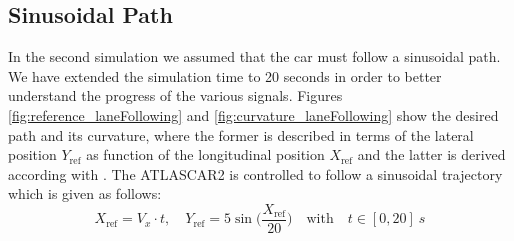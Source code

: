\subsection{Sinusoidal Path}
In the second simulation we assumed that the car must follow a sinusoidal path. We have extended the simulation time to 20 seconds in order to better understand the progress of the various signals. Figures \ref{fig:reference_laneFollowing} and \ref{fig:curvature_laneFollowing} show the desired path and its curvature, where the former is described in terms of the lateral position $Y_{\text{ref}}$ as function of the longitudinal position $X_{\text{ref}}$ and the latter is derived according with \cite{curvature}. The ATLASCAR2 is controlled to follow a sinusoidal trajectory which is given as follows:
\begin{equation}
X_\text{ref}=V_x\cdot t, \quad Y_\text{ref}=\displaystyle 5\sin\Big(\frac{X_\text{ref}}{20}\Big)\quad \text{with}\quad t\in[0,20]\SI{}{s}
\end{equation}
